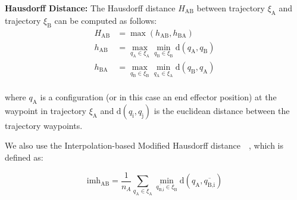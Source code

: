 \documentclass[letterpaper, 10 pt, conference]{ieeeconf}  %
\newcommand{\tj}[1]{\ensuremath{\xi_\text{#1}}}
\begin{document}





{\bf Hausdorff Distance:}
The Hausdorff distance $H_\text{AB}$ between trajectory $\xi_\text{A}$ and trajectory $\xi_\text{B}$ can be computed as follows:
\begin{equation}
\begin{aligned}
H_\text{AB} &= \max (h_{\text{AB}}, h_{\text{BA}}) \\
h_{\text{AB}} &= \max_{q_\text{A} \in \xi_\text{A}} \min_{q_\text{B} \in \xi_\text{B}} \text{d}(q_\text{A}, q_\text{B})\\
h_{\text{BA}} &= \max_{q_\text{B} \in \xi_\text{B}} \min_{q_\text{A} \in \xi_\text{A}} \text{d}(q_\text{B}, q_\text{A})\\
\end{aligned}
\end{equation}

where $q_\text{A}$ is a configuration (or in this case an end effector position) at the waypoint in trajectory \tj{A} and $\text{d}(q_\text{i}, q_\text{j})$ is the euclidean distance between the trajectory waypoints.

We also use the Interpolation-based Modified Hausdorff distance~\cite{dubuisson1994modified}~\cite{chen2013dynamic}, which is defined as:

\begin{equation}
\text{imh}_\text{AB} = \frac{1}{n_A} \sum_{q_\text{A} \in \xi_\text{A}} \min_{\overline{q_\text{B,i}} \in \xi_\text{B}} \text{d}(q_\text{A}, \overline{q_\text{B,i}})
\end{equation}
\end{document}

